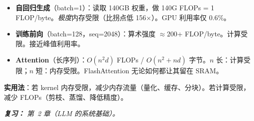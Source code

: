 \begin{questionbox}
\begin{itemize}
  \item \textbf{自回归生成}（batch=1）：读取 140GB 权重，做 140G FLOPs = 1 FLOP/byte。\emph{极度}内存受限（比拐点低 156$\times$）。GPU 利用率仅 0.6\%。
  \item \textbf{训练前向}（batch=128，seq=2048）：算术强度 $\approx 200$+ FLOP/byte。计算受限。接近峰值利用率。
  \item \textbf{Attention}（长序列）：$O(n^2 d)$ FLOPs / $O(n^2 + nd)$ 字节。$n$ 长：计算受限；$n$ 短：内存受限。FlashAttention 无论如何都让其留在 SRAM。
\end{itemize}

\textbf{实用法}：若 kernel 内存受限，减少内存流量（量化、缓存、分块）。若计算受限，减少 FLOPs（剪枝、蒸馏、降低精度）。

\emph{\textbf{复习：} 第~2 章（LLM 的系统基础）。}
\end{questionbox}

